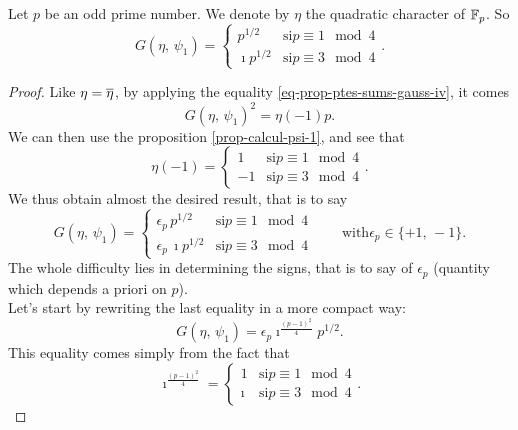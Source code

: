 \begin{prop}
\label{prop-sign-are-gauss}
Let $ p $ be an odd prime number. We denote by $ \eta $ the quadratic character of $ \mathbb{F}_p $. So
\begin{equation*}
G (\eta, \, \psi_1) = \left\{\begin{array}{ll} p^{1/2} & \text{si} p \equiv 1 \mod{4} \\\imath p^{1/2} & \text{si} p \equiv 3 \mod{4} \end{array} \right. .
\end{equation*}
\end{prop}
\begin{proof}
Like $ \eta = \overline{\eta} $, by applying the equality \eqref{eq-prop-ptes-sums-gauss-iv}, it comes
\begin{equation*}
G (\eta, \, \psi_1)^2 = \eta (-1) p.
\end{equation*}
We can then use the proposition \ref{prop-calcul-psi-1}, and see that
\begin{equation*}
\eta (-1) = \left\{\begin{array}{ll} 1 & \text{si} p \equiv 1 \mod{4} \\-1 & \text{si} p \equiv 3 \mod{4} \end{array} \right. .
\end{equation*}
We thus obtain almost the desired result, that is to say
\begin{equation*}
G (\eta, \, \psi_1) = \left\{\begin{array}{ll} \epsilon_p \, p^{1/2} & \text{si} p \equiv 1 \mod{4} \\\epsilon_p \, \imath p^{1/2} & \text{si} p \equiv 3 \mod{4} \end{array} \right. \quad \quad \text{with} \epsilon_p \in \{+1, \, - 1\}.
\end{equation*}
The whole difficulty lies in determining the signs, that is to say of $ \epsilon_p $ (quantity which depends a priori on $ p $). \\Let's start by rewriting the last equality in a more compact way:
\begin{equation*}
G (\eta, \, \psi_1) = \epsilon_p \imath^{\frac{(p-1)^2}{4}} p^{1/2}.
\end{equation*}
This equality comes simply from the fact that
\begin{equation*}
\imath^{\frac{(p-1)^2}{4}} = \left\{\begin{array}{ll} 1 & \text{si} p \equiv 1 \mod{4} \\\imath & \text{si} p \equiv 3 \mod{4} \end{array} \right. .

\end{equation*}
\end{proof}
